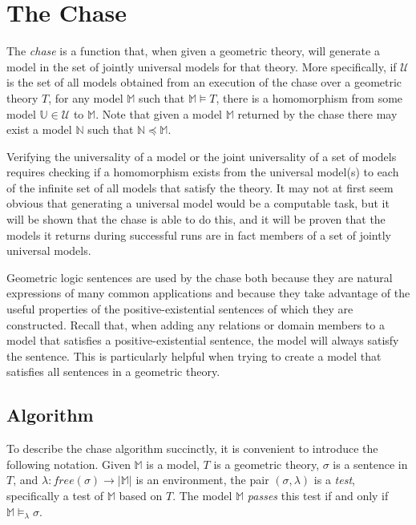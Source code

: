 \section{The Chase}
\label{sec:chase}

	The \emph{chase} is a function that, when given a geometric theory, will
	generate a model in the set of jointly universal models for that theory. More
	specifically, if $\mathcal{U}$ is the set of all models obtained from an
	execution of the chase over a geometric theory $T$, for any model
	$\mathbb{M}$ such that $\mathbb{M} \models T$, there is a homomorphism from
	some model $\mathbb{U} \in \mathcal{U}$ to $\mathbb{M}$. Note that given a
	model $\mathbb{M}$ returned by the chase there may exist a model
	$\mathbb{N}$ such that $\mathbb{N} \preceq \mathbb{M}$.

	Verifying the universality of a model or the joint universality of a set of
	models requires checking if a homomorphism exists from the universal model(s)
	to each of the infinite set of all models that satisfy the theory. It may
	not at first seem obvious that generating a universal model would be a
	computable task, but it will be shown that the chase is able to do this,
	and it will be proven that the models it returns during successful runs are
	in fact members of a set of jointly universal models.

	Geometric logic sentences are used by the chase both because they are
	natural expressions of many common applications and because they take
	advantage of the useful properties of the positive-existential sentences
	of which they are constructed. Recall that, when adding any relations or
	domain members to a model that satisfies a positive-existential sentence,
	the model will always satisfy the sentence. This is particularly helpful
	when trying to create a model that satisfies all sentences in a geometric
	theory.

	\subsection{Algorithm}
	\label{sec:chase.algorithm}

		To describe the chase algorithm succinctly, it is convenient to
		introduce the following notation. Given $\mathbb{M}$ is a model, $T$ is
		a geometric theory, $\sigma$ is a sentence in $T$, and $\lambda :
		free(\sigma) \to |\mathbb{M}|$ is an environment, the pair
		$(\sigma,\lambda)$ is a \emph{test}, specifically a test of
		$\mathbb{M}$ based on $T$. The model $\mathbb{M}$ \emph{passes} this
		test if and only if $\mathbb{M} \models_\lambda \sigma$.

